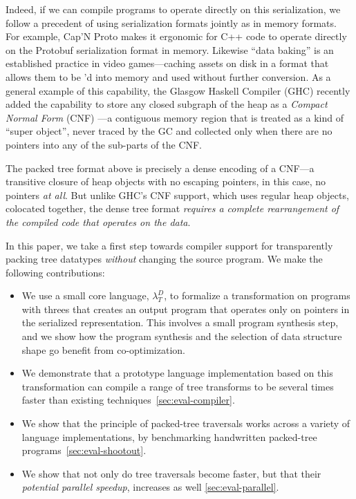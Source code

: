 \documentclass[preprint,10pt,nocopyrightspace,nonatbib]{./bibs/sigplanconf}
\begin{document}
Indeed, if we can compile programs to operate directly on this serialization, we
follow a precedent of using serialization formats jointly as in memory formats.
For example, Cap'N Proto \cite{capnproto} makes it ergonomic for C++ code to operate directly
on the Protobuf serialization format in memory.  Likewise ``data baking''
\cite{data-baking} is an established practice in video games---caching assets on
disk in a format that allows them to be 'd into memory and used
without further conversion.  As a general example of this capability, the
Glasgow Haskell Compiler (GHC) recently added the capability to store any closed
subgraph of the heap as a {\em Compact Normal Form} (CNF) \cite{cnf-icfp15}---a
contiguous memory region that is treated as a kind of ``super object'', never
traced by the GC and collected only when there are no pointers into any of the
sub-parts of the CNF.

The packed tree format above is precisely a dense encoding of a CNF---a
transitive closure of heap objects with no escaping pointers, in this case, no
pointers {\em at all}.  But unlike GHC's CNF support, which uses regular heap
objects, colocated together, the dense tree format {\em requires a complete
rearrangement of the compiled code that operates on the data}.


In this paper, we take a first step towards compiler support for transparently
packing tree datatypes {\em without} changing the source program.  We make the
following contributions:

\newcommand{\calculus}{$\lambda^D_T$} %

\begin{itemize}
\item We use a small core language, \calculus{}, to formalize a transformation
  on programs with threes that creates an output program that operates only on
  pointers in the serialized representation.  This involves a small program
  synthesis step, and we show how the program synthesis and the selection of
  data structure shape go benefit from co-optimization.
  
\item We demonstrate that a prototype language implementation based on this
  transformation can compile a range of tree transforms to be several times
  faster than existing techniques~\cref{sec:eval-compiler}.
  
\item We show that the principle of packed-tree traversals works across a
  variety of language implementations, by benchmarking handwritten packed-tree
  programs~\cref{sec:eval-shootout}.
  
\item We show that not only do tree traversals become faster, but that their
  {\em potential parallel speedup}, increases as well \cref{sec:eval-parallel}.
\end{itemize}
\end{document}

